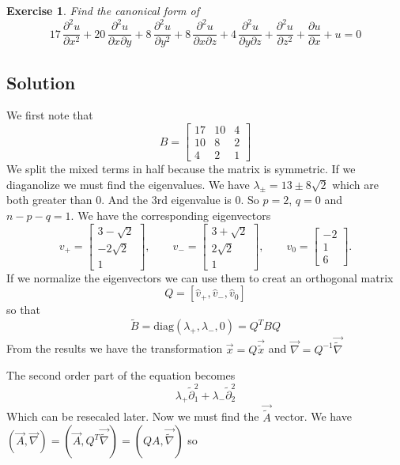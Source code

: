 \documentclass[11pt,a4paper]{article}
\newtheorem*{exercise}{Exercise}
\newcommand{\solution}[1]{
	\subsection*{Solution}
	#1
}
\begin{document}
		\begin{exercise}
			Find the  canonical form of
			$$17\,\frac{\partial^2 u}{\partial x^2}
			+ 20\,\frac{\partial^2 u}{\partial x \partial y}
			+ 8\,\frac{\partial^2 u}{\partial y^2}
			+ 8\,\frac{\partial^2 u}{\partial x \partial z}
			+ 4\,\frac{\partial^2 u}{\partial y \partial z}
			+ \frac{\partial^2 u}{\partial z^2}
			+ \frac{\partial u}{\partial x}
			+ u = 0$$
		\end{exercise}

\solution{
We first note that
\[
B =
\begin{bmatrix}
	17 & 10 & 4 \\
	10 & 8 & 2 \\
	4 & 2 & 1
\end{bmatrix}
\]
We split the mixed terms in half because the matrix is symmetric. If we diaganolize we must find the eigenvalues. We have $\lambda_{\pm} = 13 \pm 8\sqrt{2}$ which are both greater than 0. And the 3rd eigenvalue is 0. So $p = 2$, $q = 0$ and $n-p-q = 1$. We have the corresponding eigenvectors 
\[
v_+ = \begin{bmatrix} 3-\sqrt{2} \\ -2\sqrt{2} \\ 1 \end{bmatrix}, \qquad
v_{-} = \begin{bmatrix} 3+\sqrt{2} \\ 2\sqrt{2} \\ 1 \end{bmatrix}, \qquad
v_{0} = \begin{bmatrix} -2 \\ 1 \\ 6 \end{bmatrix}.
\]
If we normalize the eigenvectors we can use them to creat an orthogonal matrix
\[
Q =
[\hat{v}_{+},\hat{v}_{-},\hat{v}_{0}]
\]
so that
$$
\tilde{B} = \text{diag}(\lambda_{+}, \lambda_{-}, 0) = Q^{T}BQ
$$
From the results we have the transformation $\vec{x} = Q \vec{\tilde{x}}$ and $\vec{\nabla}= Q^{-1}\vec{\tilde{\nabla}}$
} The second order part of the equation becomes
$$
\lambda_{+}\tilde\partial_{1}^{2} + \lambda_{-}\tilde\partial_{2}^{2} 
$$
Which can be resecaled later. Now we must find the $\vec{\tilde{A}}$ vector. We have $(\vec{A},\vec{\nabla})=(\vec{A},Q^{T}\vec{\tilde{\nabla}}) = (QA,\vec{\tilde{\nabla}})$ so 
\end{document}
